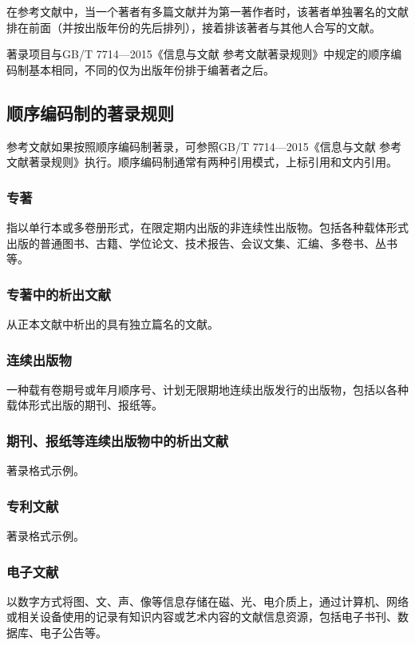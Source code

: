 在参考文献中，当一个著者有多篇文献并为第一著作者时，该著者单独署名的文献排在前面（并按出版年份的先后排列），接着排该著者与其他人合写的文献。

著录项目与GB/T 7714—2015《信息与文献 参考文献著录规则》中规定的顺序编码制基本相同，不同的仅为出版年份排于编著者之后。

\subsection{顺序编码制的著录规则}

参考文献如果按照顺序编码制著录，可参照GB/T 7714—2015《信息与文献 参考文献著录规则》执行。顺序编码制通常有两种引用模式，上标引用\cite{li2002}和文内引用。

\subsubsection{专著}

指以单行本或多卷册形式，在限定期内出版的非连续性出版物。包括各种载体形式出版的普通图书、古籍、学位论文、技术报告、会议文集、汇编、多卷书、丛书等。
\cite{li2002,tian1986,zhao1998,xin1994,peebles2001,lin2006}

\subsubsection{专著中的析出文献}

从正本文献中析出的具有独立篇名的文献。
\cite{cheng1999}

\subsubsection{连续出版物}

一种载有卷期号或年月顺序号、计划无限期地连续出版发行的出版物，包括以各种载体形式出版的期刊、报纸等。
\cite{zhong1936,zhongtu1957,aaas1883}

\subsubsection{期刊、报纸等连续出版物中的析出文献}

著录格式示例。
\cite{wang2011shu,zheng2000yun,fu2000da}

\subsubsection{专利文献}

著录格式示例。
\cite{jiang1989,xi2002}

\subsubsection{电子文献}

以数字方式将图、文、声、像等信息存储在磁、光、电介质上，通过计算机、网络或相关设备使用的记录有知识内容或艺术内容的文献信息资源，包括电子书刊、数据库、电子公告等。
\cite{oclc}
